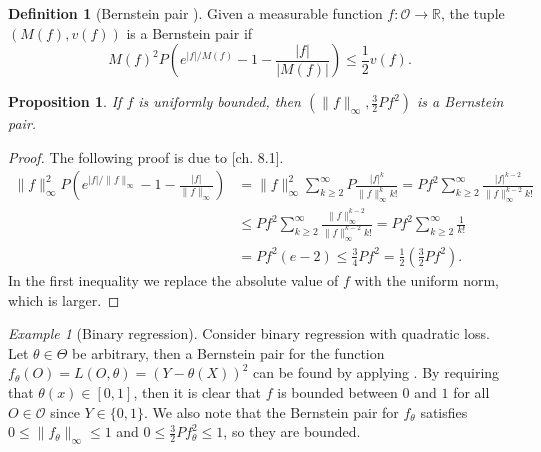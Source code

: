 \documentclass[11pt, a4paper]{article}
\newtheorem{proposition}[theorem]{Proposition}
\theoremstyle{definition}
\newtheorem{definition}[theorem]{Definition}
\theoremstyle{remark}
\newtheorem{example}{Example}
\newcommand\norm[1]{\lVert#1\rVert}
\newcommand{\btheta}{\theta}
\begin{document}
\begin{definition}[Bernstein pair \parencite{vaart06}]
    Given a measurable function $ f: \mathcal{O} \to \mathbb{R} $, the tuple $ (M(f) , v(f)) $ is a Bernstein pair if 
    \begin{equation} \label{bernstein}
        M(f)^2 P\left( e^{|f|/M(f)} -1 - \frac{|f|}{|M(f)|}\right) \leq \frac{1}{2}v(f). 
    \end{equation}
\end{definition}
\begin{proposition} \label{unifbernstein}
    If $ f $ is uniformly bounded, then $ (\norm{f}_{\infty}, \frac{3}{2} Pf^2 ) $ is a Bernstein pair. 
\end{proposition}
\begin{proof}
    The following proof is due to \parencite{vaart06}[ch. 8.1]. 
    \begin{align*}
        \norm{f}_{\infty}^2 P\left( e^{|f|/\norm{f}_{\infty}} -1 - \frac{|f|}{\norm{f}_{\infty}}\right) &= \norm{f}_{\infty}^{2} \sum_{k \geq 2}^{\infty} P \frac{|f|^{k}}{\norm{f}^{k}_{\infty}k!} = Pf^2 \sum_{k \geq 2}^{\infty} \frac{|f|^{k-2}}{\norm{f}^{k-2}_{\infty} k! } \\
                                                                                                        &\leq P f^2 \sum_{k \geq 2}^{\infty} \frac{\norm{f}_{\infty}^{k-2}}{\norm{f}^{k-2}_{\infty} k! } = P f^2 \sum_{k \geq 2}^{\infty} \frac{1}{k !}\\
                                                                                                        &= P f^2 (e-2)\leq \frac{3}{4} P f^2 = \frac{1}{2} \left(\frac{3}{2} Pf^2\right). 
    \end{align*}
   In the first inequality we replace the absolute value of $ f $ with the uniform norm, which is larger. 
\end{proof}

\begin{example}[Binary regression] \label{ex:bernsteinexample}
    Consider binary regression with quadratic loss. Let $ \btheta \in \Theta $ be arbitrary, then a Bernstein pair for the function $ f_{\btheta}(O) = L(O, \btheta) = (Y - \theta(X))^2$ can be found by applying . By requiring that $ \theta(x) \in [0, 1] $, then it is clear that $ f $ is bounded between $ 0 $ and $ 1 $ for all $ O \in \mathcal{O} $ since $ Y \in \{0, 1\} $. We also note that the Bernstein pair for $ f_{\btheta} $ satisfies $ 0 \leq \norm{f_\theta}_{\infty} \leq 1 $ and $ 0 \leq \frac{3}{2}Pf_{\btheta}^2 \leq 1 $, so they are bounded. 

\end{example}
\end{document}

